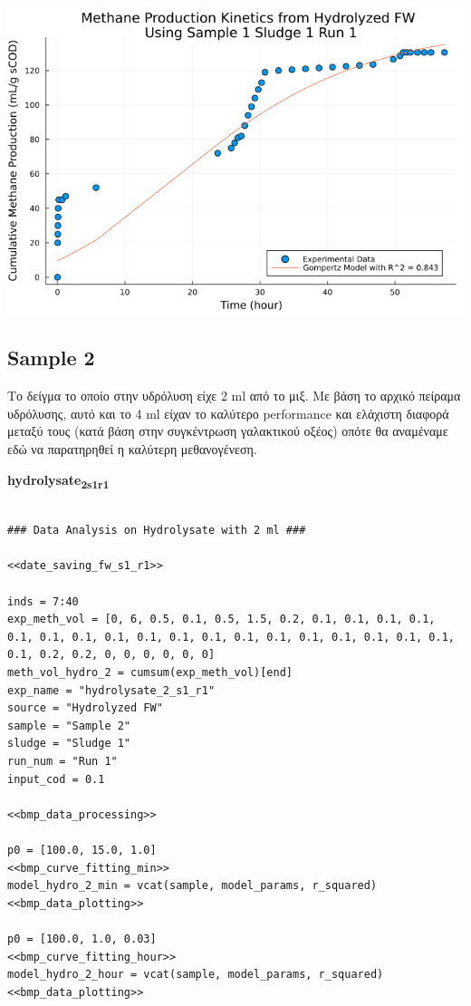 \documentclass[11pt]{article}
\begin{document}
\begin{center}
\includegraphics[width=.9\linewidth]{../plots/BMPs/Hydrolyzed FW/methane_kinetics_hydrolysate_1_s1_r1_hour.png}
\end{center}

\subsection{Sample 2}
\label{sec:org82e2b27}
Το δείγμα το οποίο στην υδρόλυση είχε 2 ml από το μιξ. Με βάση το αρχικό πείραμα υδρόλυσης, αυτό και το 4 ml είχαν το καλύτερο performance και ελάχιστη διαφορά μεταξύ τους (κατά βάση στην συγκέντρωση γαλακτικού οξέος) οπότε θα αναμέναμε εδώ να παρατηρηθεί η καλύτερη μεθανογένεση.

\textbf{hydrolysate\textsubscript{2}\textsubscript{s1}\textsubscript{r1}}
\begin{verbatim}

### Data Analysis on Hydrolysate with 2 ml ###

<<date_saving_fw_s1_r1>>

inds = 7:40
exp_meth_vol = [0, 6, 0.5, 0.1, 0.5, 1.5, 0.2, 0.1, 0.1, 0.1, 0.1, 0.1, 0.1, 0.1, 0.1, 0.1, 0.1, 0.1, 0.1, 0.1, 0.1, 0.1, 0.1, 0.1, 0.1, 0.1, 0.2, 0.2, 0, 0, 0, 0, 0, 0]
meth_vol_hydro_2 = cumsum(exp_meth_vol)[end]
exp_name = "hydrolysate_2_s1_r1"
source = "Hydrolyzed FW"
sample = "Sample 2"
sludge = "Sludge 1"
run_num = "Run 1"
input_cod = 0.1

<<bmp_data_processing>>

p0 = [100.0, 15.0, 1.0]
<<bmp_curve_fitting_min>>
model_hydro_2_min = vcat(sample, model_params, r_squared)
<<bmp_data_plotting>>

p0 = [100.0, 1.0, 0.03]
<<bmp_curve_fitting_hour>>
model_hydro_2_hour = vcat(sample, model_params, r_squared)
<<bmp_data_plotting>>
\end{verbatim}
\end{document}

